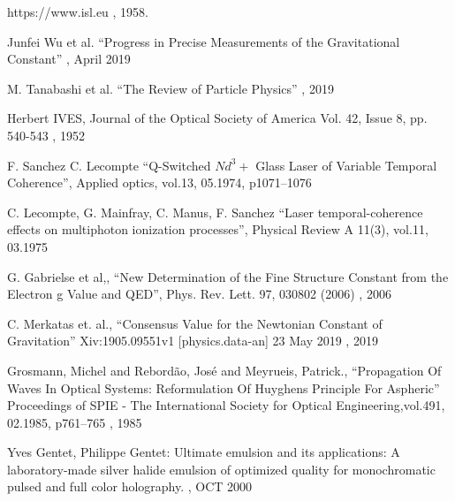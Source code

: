 \documentclass[a4paper,12pt]{article}
\begin{document}
\begin{appendix}
\begin{thebibliography}{1}
  https://www.isl.eu
, 1958.

  Junfei Wu et al. ``Progress in Precise Measurements of the Gravitational Constant''
, April 2019

 M. Tanabashi et al. ``The Review of Particle Physics''
, 2019

 Herbert IVES, Journal of the Optical Society of America Vol. 42, Issue 8, pp. 540-543 
, 1952

 F. Sanchez C. Lecompte ``Q-Switched $Nd^3+$ Glass Laser of Variable Temporal Coherence'', Applied optics, vol.13, 05.1974, p1071--1076

 C. Lecompte, G. Mainfray, C. Manus, F. Sanchez ``Laser temporal-coherence effects on multiphoton ionization processes'', Physical Review A 11(3), vol.11, 03.1975

 G. Gabrielse et al,, ``New Determination of the Fine Structure Constant from the Electron g Value and  QED'',  Phys. Rev. Lett. 97, 030802 (2006)
, 2006

 C. Merkatas et. al., ``Consensus Value for the Newtonian Constant of Gravitation'' Xiv:1905.09551v1 [physics.data-an] 23 May 2019
, 2019

 Grosmann, Michel and Rebordão, José and Meyrueis, Patrick., ``Propagation Of Waves In Optical Systems: Reformulation Of Huyghens Principle For Aspheric'' Proceedings of SPIE - The International Society for Optical Engineering,vol.491, 02.1985, p761--765
, 1985

 Yves Gentet, Philippe Gentet: Ultimate emulsion and its applications: A laboratory-made silver halide emulsion of optimized quality for monochromatic pulsed and full color holography.
, OCT 2000

\end{thebibliography}
\end{appendix}
\end{document}
